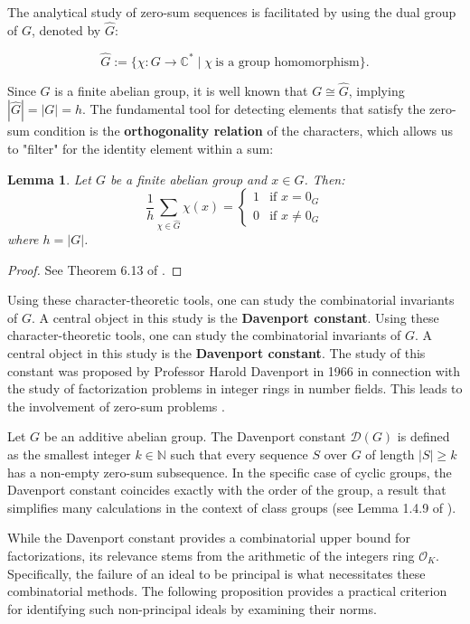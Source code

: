 \documentclass[11pt]{article}
\newtheorem{lemma}{Lemma}
\theoremstyle{definition}
\begin{document}
The analytical study of zero-sum sequences is facilitated by using the dual group of $G$, denoted by $\hat{G}$:

\[ \hat{G}:=\{ \chi:G \to \mathbb{C}^{*}\mid \chi \ \text{is a group homomorphism}\}. \]

Since $G$ is a finite abelian group, it is well known that $G \cong \hat{G}$, implying $|\hat{G}| = |G| = h$. The fundamental tool for detecting elements that satisfy the zero-sum condition is the \textbf{orthogonality relation} of the characters, which allows us to "filter" for the identity element within a sum:

\begin{lemma}
Let $G$ be a finite abelian group and $x \in G$. Then:
\begin{equation}
    \frac{1}{h} \sum_{\chi \in \hat{G}} \chi(x) = 
    \begin{cases} 
    1 & \text{if } x = 0_G \\
    0 & \text{if } x \neq 0_G 
    \end{cases}
\end{equation}
where $h = |G|$.
\end{lemma}
\begin{proof}
    See Theorem 6.13 of \cite{Ap}.
\end{proof}

\medskip
Using these character-theoretic tools, one can study the combinatorial invariants of $G$. A central object in this study is the \textbf{Davenport constant}. Using these character-theoretic tools, one can study the combinatorial invariants of $G$. A central object in this study is the \textbf{Davenport constant}. The study of this constant was proposed by Professor Harold Davenport in 1966 in connection with the study of factorization problems in integer rings in number fields. This leads to the involvement of zero-sum problems \cite{olson}.



Let $G$ be an additive abelian group. The Davenport constant $\mathcal{D}(G)$ is defined as the smallest integer $k \in \mathbb{N}$ such that every sequence $S$ over $G$ of length $|S| \ge k$ has a non-empty zero-sum subsequence. In the specific case of cyclic groups, the Davenport constant coincides exactly with the order of the group, a result that simplifies many calculations in the context of class groups (see Lemma 1.4.9 of \cite{GH06}).


\medskip
While the Davenport constant provides a combinatorial upper bound for factorizations, its relevance stems from the arithmetic of the integers ring $\mathcal{O}_K$. Specifically, the failure of an ideal to be principal is what necessitates these combinatorial methods. The following proposition provides a practical criterion for identifying such non-principal ideals by examining their norms.
\end{document}
